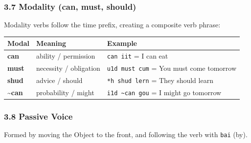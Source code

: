 \subsubsection{3.7 Modality (can, must,
should)}\label{modality-can-must-should}

Modality verbs follow the time prefix, creating a composite verb phrase:

{\def\LTcaptype{} %
\begin{longtable}[]{@{}
  >{\raggedright\arraybackslash}p{}
  >{\raggedright\arraybackslash}p{}
  >{\raggedright\arraybackslash}p{}@{}}
\toprule\noalign{}
\begin{minipage}[b]{\linewidth}\raggedright
Modal
\end{minipage} & \begin{minipage}[b]{\linewidth}\raggedright
Meaning
\end{minipage} & \begin{minipage}[b]{\linewidth}\raggedright
Example
\end{minipage} \\
\midrule\noalign{}
\endhead
\bottomrule\noalign{}
\endlastfoot
\textbf{can} & ability / permission & \texttt{can\ iit} = I can eat \\
\textbf{must} & necessity / obligation & \texttt{u1d\ must\ cum} = You
must come tomorrow \\
\textbf{shud} & advice / should & \texttt{*h\ shud\ lern} = They should
learn \\
\textbf{\textasciitilde can} & probability / might &
\texttt{i1d\ \textasciitilde{}can\ gou} = I might go tomorrow \\
\end{longtable}
}

\subsubsection{3.8 Passive Voice}\label{passive-voice}

Formed by moving the Object to the front, and following the verb with
\texttt{bai} (by).

